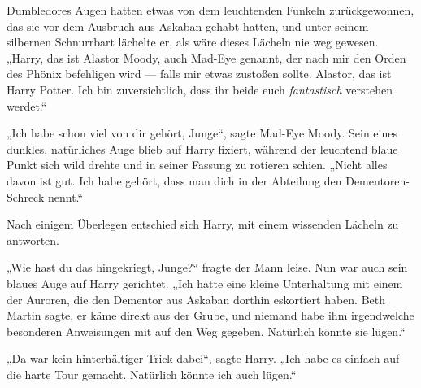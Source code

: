 Dumbledores Augen hatten etwas von dem leuchtenden Funkeln zurückgewonnen, das sie vor dem Ausbruch aus Askaban gehabt hatten, und unter seinem silbernen Schnurrbart lächelte er, als wäre dieses Lächeln nie weg gewesen.
„Harry, das ist Alastor Moody, auch Mad-Eye genannt, der nach mir den Orden des Phönix befehligen wird — falls mir etwas zustoßen sollte. Alastor, das ist Harry Potter. Ich bin zuversichtlich, dass ihr beide euch \emph{fantastisch} verstehen werdet.“

„Ich habe schon viel von dir gehört, Junge“, sagte Mad-Eye Moody. Sein eines dunkles, natürliches Auge blieb auf Harry fixiert, während der leuchtend blaue Punkt sich wild drehte und in seiner Fassung zu rotieren schien.
„Nicht alles davon ist gut. Ich habe gehört, dass man dich in der Abteilung den Dementoren-Schreck nennt.“

Nach einigem Überlegen entschied sich Harry, mit einem wissenden Lächeln zu antworten.

„Wie hast du das hingekriegt, Junge?“ fragte der Mann leise. Nun war auch sein blaues Auge auf Harry gerichtet.
„Ich hatte eine kleine Unterhaltung mit einem der Auroren, die den Dementor aus Askaban dorthin eskortiert haben. Beth Martin sagte, er käme direkt aus der Grube, und niemand habe ihm irgendwelche besonderen Anweisungen mit auf den Weg gegeben. Natürlich könnte sie lügen.“

„Da war kein hinterhältiger Trick dabei“, sagte Harry.
„Ich habe es einfach auf die harte Tour gemacht. Natürlich könnte ich auch lügen.“

